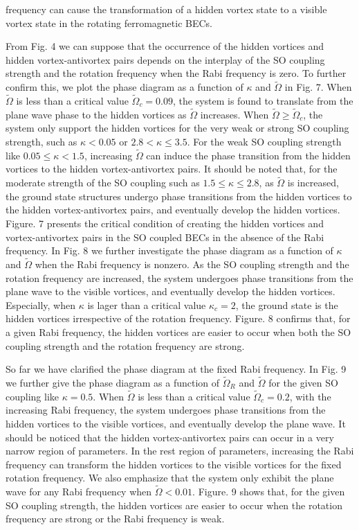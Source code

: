 \documentclass[aps,pra,showpacs,twocolumn,superscriptaddress]{revtex4-1}
\begin{document}
frequency can cause the transformation of a hidden vortex state to a visible vortex state in the rotating ferromagnetic BECs.

From Fig. 4 we can suppose that the occurrence of the hidden vortices and hidden vortex-antivortex pairs depends on the interplay of the SO coupling strength and the rotation frequency when the Rabi frequency is zero. To further confirm this, we plot the phase diagram as a function of $\kappa$ and $\tilde{\Omega}$ in Fig. 7. When
$\tilde{\Omega}$ is less than a critical value $\tilde{\Omega}_{c}=0.09$, the system is found to translate from the plane wave phase to the hidden vortices as $\tilde{\Omega}$ increases. When $\tilde{\Omega}\geq\tilde{\Omega}_{c}$, the system only support the hidden vortices for the very weak or strong SO coupling strength, such as $\kappa<0.05$ or $2.8<\kappa\leq3.5$. For the weak SO coupling strength like $0.05\leq\kappa<1.5$, increasing $\tilde{\Omega}$ can induce the phase transition from the hidden vortices to the hidden vortex-antivortex pairs. It should be noted that, for the moderate strength of the SO coupling such as $1.5\leq\kappa\leq2.8$, as $\tilde{\Omega}$ is increased, the ground state structures undergo phase transitions from the hidden vortices to the hidden vortex-antivortex pairs, and eventually develop the hidden vortices. Figure. 7 presents the critical condition of creating the hidden vortices and vortex-antivortex pairs in the SO coupled BECs in the absence of the Rabi frequency. In Fig. 8 we further investigate the phase diagram as a function of $\kappa$ and $\tilde{\Omega}$ when the Rabi frequency is nonzero. As the SO coupling strength and the rotation frequency are increased, the system undergoes phase transitions from the plane wave to the visible vortices, and eventually develop the hidden vortices. Especially, when $\kappa$ is lager than a critical value $\kappa_{c}=2$, the ground state is the hidden vortices irrespective of the rotation frequency. Figure. 8 confirms that, for a given Rabi frequency, the hidden vortices are easier to occur when both the SO coupling strength and the rotation frequency are strong.

So far we have clarified the phase diagram at the fixed Rabi frequency. In Fig. 9 we further give the phase diagram as a function of $\tilde{\Omega}_{R}$ and $\tilde{\Omega}$ for the given SO coupling like $\kappa=0.5$. When $\tilde{\Omega}$ is less than a critical value $\tilde{\Omega}_{c}=0.2$, with the increasing Rabi frequency, the system undergoes phase transitions from the hidden vortices to the visible vortices, and eventually develop the plane wave. It should be noticed that the hidden vortex-antivortex pairs can occur in a very narrow region of parameters. In the rest region of parameters, increasing the Rabi frequency can transform the hidden vortices to the visible vortices for the fixed rotation frequency. We also emphasize that the system only exhibit the plane wave for any Rabi frequency when $\tilde{\Omega}<0.01$. Figure. 9 shows that, for the given SO coupling strength, the hidden vortices are easier to occur when the rotation frequency are strong or the Rabi frequency is weak.
\end{document}
